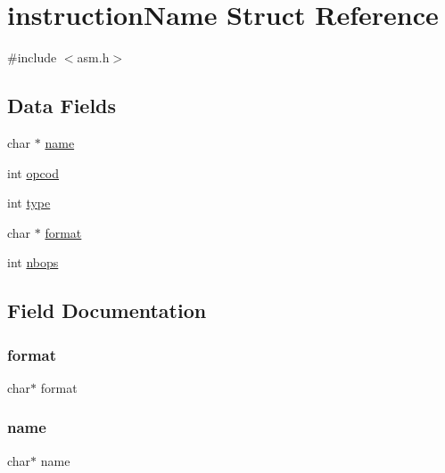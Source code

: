 \hypertarget{structinstruction_name}{}\section{instruction\+Name Struct Reference}
\label{structinstruction_name}


{\ttfamily \#include $<$asm.\+h$>$}

\subsection*{Data Fields}
\begin{DoxyCompactItemize}
\item 
char $\ast$ \hyperlink{structinstruction_name_a5ac083a645d964373f022d03df4849c8}{name}
\item 
int \hyperlink{structinstruction_name_a87e59bd69d9de26089c9d13e5c75c086}{opcod}
\item 
int \hyperlink{structinstruction_name_ac765329451135abec74c45e1897abf26}{type}
\item 
char $\ast$ \hyperlink{structinstruction_name_a5407a229a5e1a319d75fb29542c83eae}{format}
\item 
int \hyperlink{structinstruction_name_a34aaf7e4790814fce09b357e1de1a4da}{nbops}
\end{DoxyCompactItemize}


\subsection{Field Documentation}
\mbox{\label{structinstruction_name_a5407a229a5e1a319d75fb29542c83eae}} 
\subsubsection{\texorpdfstring{format}{format}}
{\footnotesize\ttfamily char$\ast$ format}

\mbox{\label{structinstruction_name_a5ac083a645d964373f022d03df4849c8}} 
\subsubsection{\texorpdfstring{name}{name}}
{\footnotesize\ttfamily char$\ast$ name}

